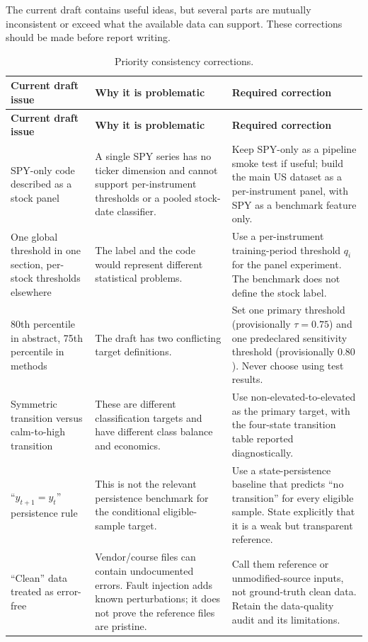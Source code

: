 \documentclass[11pt,a4paper]{article}
\begin{document}
The current draft contains useful ideas, but several parts are mutually inconsistent or exceed what the available data can support. These corrections should be made before report writing.

\begin{longtable}{p{3.2cm}p{5.8cm}p{5.7cm}}
\caption{Priority consistency corrections.}\label{tab:consistency}\\
\toprule
\textbf{Current draft issue} & \textbf{Why it is problematic} & \textbf{Required correction}\\
\midrule
\endfirsthead
\toprule
\textbf{Current draft issue} & \textbf{Why it is problematic} & \textbf{Required correction}\\
\midrule
\endhead
SPY-only code described as a stock panel & A single SPY series has no ticker dimension and cannot support per-instrument thresholds or a pooled stock-date classifier. & Keep SPY-only as a pipeline smoke test if useful; build the main US dataset as a per-instrument panel, with SPY as a benchmark feature only.\\
\addlinespace
One global threshold in one section, per-stock thresholds elsewhere & The label and the code would represent different statistical problems. & Use a per-instrument training-period threshold $q_i$ for the panel experiment. The benchmark does not define the stock label.\\
\addlinespace
80th percentile in abstract, 75th percentile in methods & The draft has two conflicting target definitions. & Set one primary threshold (provisionally $\tau=0.75$) and one predeclared sensitivity threshold (provisionally $0.80$). Never choose using test results.\\
\addlinespace
Symmetric transition versus calm-to-high transition & These are different classification targets and have different class balance and economics. & Use non-elevated-to-elevated as the primary target, with the four-state transition table reported diagnostically.\\
\addlinespace
``$y_{t+1}=y_t$'' persistence rule & This is not the relevant persistence benchmark for the conditional eligible-sample target. & Use a state-persistence baseline that predicts ``no transition'' for every eligible sample. State explicitly that it is a weak but transparent reference.\\
\addlinespace
``Clean'' data treated as error-free & Vendor/course files can contain undocumented errors. Fault injection adds known perturbations; it does not prove the reference files are pristine. & Call them reference or unmodified-source inputs, not ground-truth clean data. Retain the data-quality audit and its limitations.\\

\end{longtable}
\end{document}
